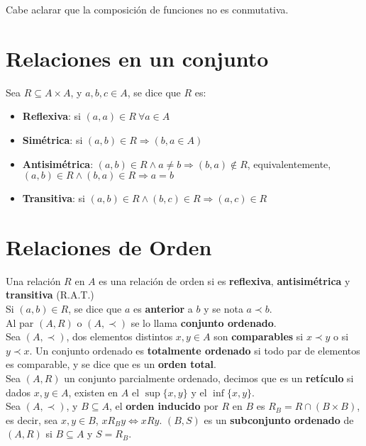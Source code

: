 \documentclass[11pt,a4paper]{article}
\begin{document}
Cabe aclarar que la composici\'on de funciones no es conmutativa.

\newpage
\section{Relaciones en un conjunto}
\noindent Sea $R \subseteq A \times A$, y $a,b,c \in A$, se dice que $R$ es:
\begin{itemize}
\item \textbf{Reflexiva}: si $(a,a) \in R\ \forall a \in A$
\item \textbf{Sim\'etrica}: si $(a,b) \in R \Rightarrow (b,a \in A)$
\item \textbf{Antisim\'etrica}: $(a,b) \in R \land a \not = b \Rightarrow (b,a) \not \in R$, equivalentemente, $(a,b) \in R \land (b,a) \in R \Rightarrow a = b$
\item \textbf{Transitiva}: si $(a,b) \in R \land (b,c) \in R \Rightarrow (a,c) \in R$
\end{itemize}

\section{Relaciones de Orden}
\noindent Una relaci\'on $R$ en $A$ es una relaci\'on de orden si es \textbf{reflexiva}, \textbf{antisim\'etrica} y \textbf{transitiva} (R.A.T.)\\

\noindent Si $(a,b) \in R$, se dice que $a$ es \textbf{anterior} a $b$ y se nota $a \prec b$.\\

\noindent Al par $(A,R)$ o $(A, \prec)$ se lo llama \textbf{conjunto ordenado}.\\

\noindent Sea $(A, \prec)$, dos elementos distintos $x, y \in A$ son \textbf{comparables} si $x \prec y$ o si $y \prec x$. Un conjunto ordenado es \textbf{totalmente ordenado} si todo par de elementos es comparable, y se dice que es un \textbf{orden total}.\\

\noindent Sea $(A,R)$ un conjunto parcialmente ordenado, decimos que es un \textbf{ret\'iculo} si dados $x,y\in A$, existen en $A$ el $\sup\{x,y\}$ y el $\inf\{x,y\}$.\\

\noindent Sea $(A, \prec)$, y $B \subseteq A$, el \textbf{orden inducido} por $R$ en $B$ es $R_B = R \cap (B\times B)$, es decir, sea $x,y \in B$, $xR_By \iff xRy$. $(B,S)$ es un \textbf{subconjunto ordenado} de $(A,R)$ si $B \subseteq A$ y $S = R_B$. \\
\end{document}
